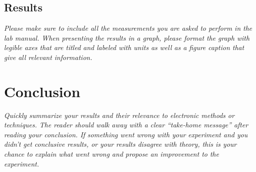 \documentclass{article}
\begin{document}

\subsection{Results}

\textit{Please make sure to include all the measurements you are asked to perform in the lab manual.
When presenting the results in a graph, please format the graph with legible axes that are
titled and labeled with units as well as a figure caption that give all relevant information.}






\section{Conclusion}

\textit{Quickly summarize your results and their relevance to electronic methods or techniques. The
reader should walk away with a clear “take-home message” after reading your conclusion. If
something went wrong with your experiment and you didn’t get conclusive results, or your
results disagree with theory, this is your chance to explain what went wrong and propose an
improvement to the experiment.}
\end{document}
